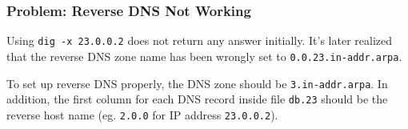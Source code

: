 \subsubsection{Problem: Reverse DNS Not Working}
Using \texttt{dig -x 23.0.0.2} does not return any answer initially.
It's later realized that the reverse DNS zone name has been wrongly set to \texttt{0.0.23.in-addr.arpa}.

To set up reverse DNS properly, the DNS zone should be \texttt{3.in-addr.arpa}. In addition, the first column for each DNS record inside file \texttt{db.23} should be the reverse host name (eg. \texttt{2.0.0} for IP address \texttt{23.0.0.2}). 



